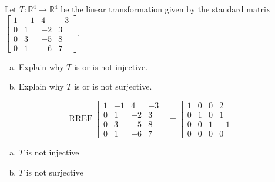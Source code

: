 
\begin{exerciseStatement}
 Let \(T:\mathbb{R}^ 4  \to \mathbb{R}^ 4 \) be the linear transformation given by the standard matrix \( \left[\begin{array}{cccc}
1 & -1 & 4 & -3 \\
0 & 1 & -2 & 3 \\
0 & 3 & -5 & 8 \\
0 & 1 & -6 & 7
\end{array}\right] .\)
\begin{enumerate}[(a)]
\item Explain why \(T\) is or is not injective.
\item Explain why \(T\) is or is not surjective.
\end{enumerate}
    
\end{exerciseStatement}
    
\begin{exerciseAnswer} 


\[\operatorname{RREF} \left[\begin{array}{cccc}
1 & -1 & 4 & -3 \\
0 & 1 & -2 & 3 \\
0 & 3 & -5 & 8 \\
0 & 1 & -6 & 7
\end{array}\right] = \left[\begin{array}{cccc}
1 & 0 & 0 & 2 \\
0 & 1 & 0 & 1 \\
0 & 0 & 1 & -1 \\
0 & 0 & 0 & 0
\end{array}\right] \]


\begin{enumerate}[(a)]
\item \(T\) is not injective
\item \(T\) is not surjective
\end{enumerate}
    
\end{exerciseAnswer}
    
